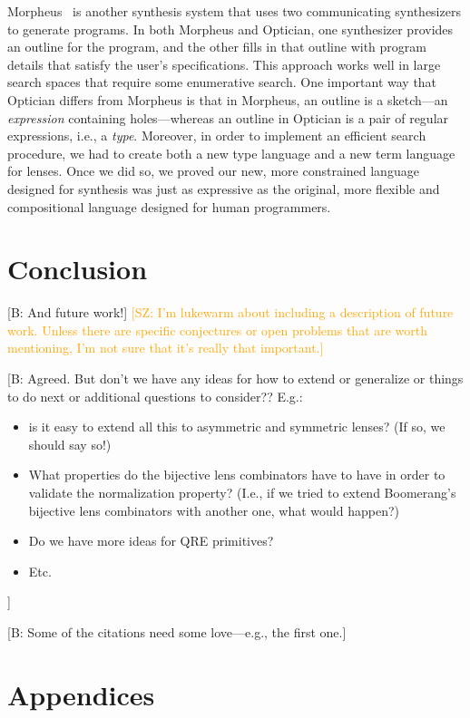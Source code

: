 \documentclass[acmsmall,review,anonymous]{acmart}
\newcommand{\FINISH}[3]{\ifdraft\textcolor{#1}{[#2: #3]}\fi}
\newcommand{\bcp}[1]{\FINISH{dkred}{B}{#1}}
\newcommand{\saz}[1]{\FINISH{orange}{SZ}{#1}}
\begin{document}
Morpheus~\cite{morpheus} is another synthesis system that uses two
communicating synthesizers to generate programs.  In both Morpheus and
Optician, one synthesizer provides an
outline for the program, and the other fills in that outline with program
details that satisfy the user's specifications.
This approach works well in large search spaces that require some enumerative
search.
One important way that Optician differs from Morpheus is that in
Morpheus, an outline is a sketch---an
\emph{expression}
containing holes---whereas
an outline in Optician is a pair of regular
expressions, i.e., a
\emph{type}.  Moreover, in order to implement an efficient
search procedure, we had to create both a new type language and a new
term language for lenses.  Once we did so, we proved our new, more
constrained language
designed for synthesis was just as expressive as the original, more
flexible and compositional language designed for human programmers.

\section{Conclusion}
\bcp{And future work!}  \saz{I'm lukewarm about including a description of
future work.  Unless there are specific conjectures or open problems that
are worth mentioning, I'm not sure that it's really that important.}
\bcp{Agreed. But don't we have any ideas for how to extend or generalize or
things to do next or additional questions to consider??  E.g.: 
\begin{itemize}
\item is it easy to extend all this to
asymmetric and symmetric lenses?  (If so, we should say so!)
\item What properties do the bijective lens combinators have to have in
order to validate the normalization property?  (I.e., if we tried to extend
Boomerang's bijective lens combinators with another one, what would happen?)
\item Do we have more ideas for QRE primitives?
\item Etc.
\end{itemize}
}
\label{concl}

\bcp{Some of the citations need some love---e.g., the first one.}




\appendix
{}
\section*{Appendices}
\end{document}
